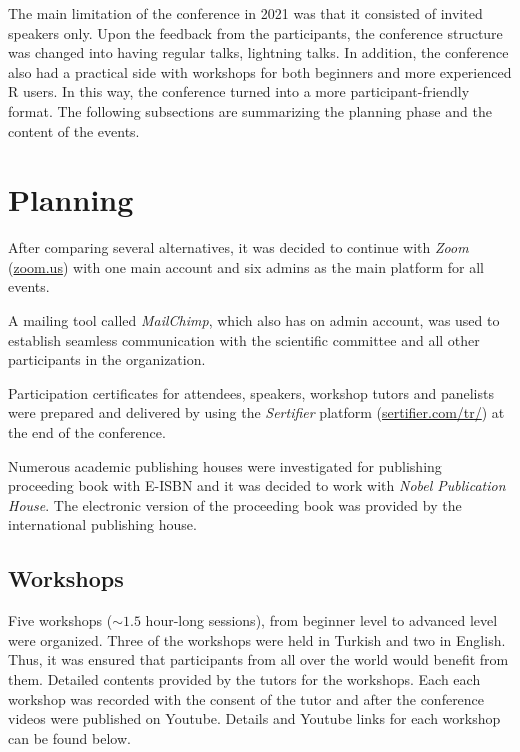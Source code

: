 The main limitation of the conference in 2021 was that it consisted of invited speakers only. Upon the feedback from the participants, the conference structure was changed into having regular talks, lightning talks. In addition, the conference also had a practical side with workshops for both beginners and more experienced R users. In this way, the conference turned into a more participant-friendly format. The following subsections are summarizing the planning phase and the content of the events.

\hypertarget{planning}{%
\section{Planning}\label{planning}}

After comparing several alternatives, it was decided to continue with \emph{Zoom} (\url{zoom.us}) with one main account and six admins as the main platform for all events.

A mailing tool called \emph{MailChimp}, which also has on admin account, was used to establish seamless communication with the scientific committee and all other participants in the organization.

Participation certificates for attendees, speakers, workshop tutors and panelists were prepared and delivered by using the \emph{Sertifier} platform (\url{sertifier.com/tr/}) at the end of the conference.

Numerous academic publishing houses were investigated for publishing proceeding book with E-ISBN and it was decided to work with \emph{Nobel Publication House}. The electronic version of the proceeding book was provided by the international publishing house.

\hypertarget{workshops}{%
\subsection{Workshops}\label{workshops}}

Five workshops (\(\sim 1.5\) hour-long sessions), from beginner level to advanced level were organized. Three of the workshops were held in Turkish and two in English. Thus, it was ensured that participants from all over the world would benefit from them. Detailed contents provided by the tutors for the workshops. Each each workshop was recorded with the consent of the tutor and after the conference videos were published on Youtube. Details and Youtube links for each workshop can be found below.

